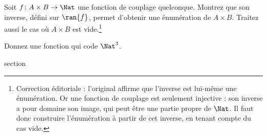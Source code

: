 \documentclass[11pt,a4paper,openany]{memoir}
\begin{document}
\begin{prob}
Soit $f \colon A \times B \to \Nat$ une fonction de couplage
quelconque. Montrez que son inverse, défini sur $\ran{f}$,
permet d’obtenir une énumération de $A \times B$.
Traitez aussi le cas où $A \times B$ est vide.\footnote{Correction
éditoriale : l’original affirme que l’inverse est lui-même une
énumération. Or une fonction de couplage est seulement injective :
son inverse a pour domaine son image, qui peut être une partie
propre de $\Nat$. Il faut donc construire l’énumération à partir
de cet inverse, en tenant compte du cas vide.}
\end{prob}

\begin{prob}
Donnez une fonction qui code $\Nat^3$.
\end{prob}


\endgroup



\begingroup
\expandafter\def\csname ol@sectioncs\endcsname{section}
\def\olfilename{pairing-alt}



\end{document}
